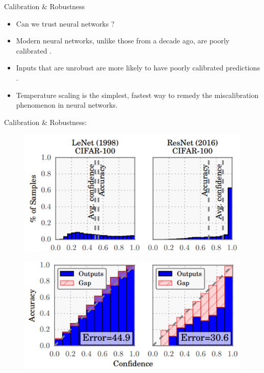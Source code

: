 \documentclass{beamer}
\begin{document}
\begin{frame}{Calibration \& Robustness}
    \begin{itemize}
        \item Can we trust neural networks ?
        \item Modern neural networks, unlike those from a decade ago, are poorly calibrated \cite{guo2017calibration}.
        \item Inputs that are unrobust are more likely to have poorly calibrated predictions \cite{qin2021improving}.
        \item Temperature scaling is the simplest, fastest way to remedy the miscalibration phenomenon in neural networks.
    \end{itemize}
\end{frame}

\begin{frame}{Calibration \& Robustness: \cite{guo2017calibration}}
    \begin{figure}
        \centering
        \includegraphics[width=0.65\linewidth]{images/calibration1.PNG}
    \end{figure}
    
    \begin{figure}
        \centering
        \includegraphics[width=0.6\linewidth]{images/calibration2.PNG}
    \end{figure}
\end{frame}
\end{document}
